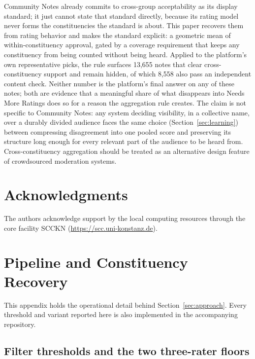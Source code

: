 \documentclass[10pt,twocolumn]{article}
\begin{document}
Community Notes already commits to cross-group acceptability as its display
standard; it just cannot state that standard directly, because its rating model
never forms the constituencies the standard is about. This paper recovers them
from rating behavior and makes the standard explicit: a geometric mean of
within-constituency approval, gated by a coverage requirement that keeps any
constituency from being counted without being heard. Applied to the platform's
own representative picks, the rule surfaces 13,655 notes that clear
cross-constituency support and remain hidden, of which 8,558 also pass an
independent content check. Neither number is the platform's final answer on any
of these notes; both are evidence that a meaningful share of what disappears
into Needs More Ratings does so for a reason the aggregation rule creates.
The claim is not specific to Community Notes: any system deciding visibility, in
a collective name, over a durably divided audience faces the same choice
(Section~\ref{sec:learning}) between compressing disagreement into one pooled
score and preserving its structure long enough for every relevant part of the
audience to be heard from. Cross-constituency aggregation should be treated as
an alternative design feature of crowdsourced moderation systems.

\section*{Acknowledgments}

The authors acknowledge support by the local computing resources through the
core facility SCCKN (\url{https://scc.uni-konstanz.de}).




\onecolumn
\appendix
\section{Pipeline and Constituency Recovery}
\label{app:pipeline}

This appendix holds the operational detail behind
Section~\ref{sec:approach}. Every threshold and variant reported here is also
implemented in the accompanying repository.

\subsection{Filter thresholds and the two three-rater floors}
\label{app:filters}
\end{document}
